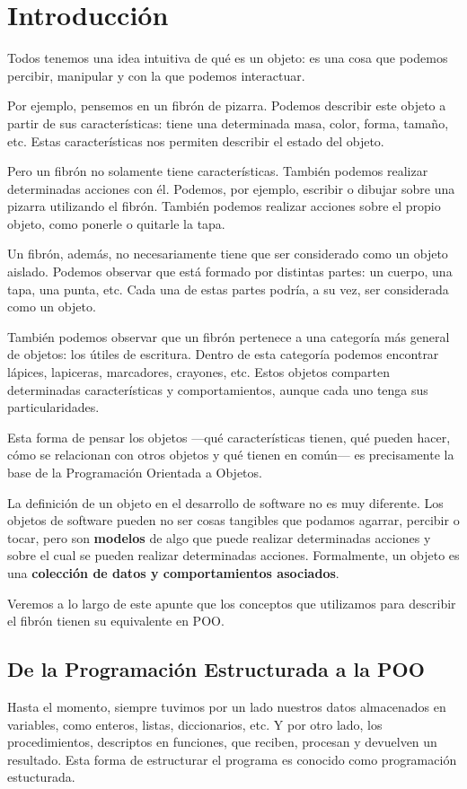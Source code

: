 \chapter{Introducción}

Todos tenemos una idea intuitiva de qué es un objeto: es una cosa que podemos percibir, manipular y con la que podemos interactuar.

Por ejemplo, pensemos en un fibrón de pizarra. Podemos describir este objeto a partir de sus características: tiene una
determinada masa, color, forma, tamaño, etc. Estas características nos permiten describir el estado del objeto.

Pero un fibrón no solamente tiene características. También podemos realizar determinadas acciones con él. Podemos, por
ejemplo, escribir o dibujar sobre una pizarra utilizando el fibrón. También podemos realizar acciones sobre el propio
objeto, como ponerle o quitarle la tapa.

Un fibrón, además, no necesariamente tiene que ser considerado como un objeto aislado. Podemos observar que está
formado por distintas partes: un cuerpo, una tapa, una punta, etc. Cada una de estas partes podría, a su vez, ser
considerada como un objeto.

También podemos observar que un fibrón pertenece a una categoría más general de objetos: los útiles de escritura. Dentro
de esta categoría podemos encontrar lápices, lapiceras, marcadores, crayones, etc. Estos objetos comparten determinadas
características y comportamientos, aunque cada uno tenga sus particularidades.

Esta forma de pensar los objetos —qué características tienen, qué pueden hacer, cómo se relacionan con otros objetos y
qué tienen en común— es precisamente la base de la Programación Orientada a Objetos.

La definición de un objeto en el desarrollo de software no es muy diferente. Los objetos de software pueden no ser cosas
tangibles que podamos agarrar, percibir o tocar, pero son \textbf{modelos} de algo que puede realizar determinadas acciones y sobre el cual
se pueden realizar determinadas acciones. Formalmente, un objeto es una \textbf{colección de datos y comportamientos asociados}.

Veremos a lo largo de este apunte que los conceptos que utilizamos para describir el fibrón tienen su equivalente en POO.

\section{De la Programación Estructurada a la POO}
Hasta el momento, siempre tuvimos por un lado nuestros datos almacenados en variables, como enteros, listas, diccionarios, etc.
Y por otro lado, los procedimientos, descriptos en funciones, que reciben, procesan y devuelven un resultado. Esta forma de estructurar
el programa es conocido como programación estucturada.

